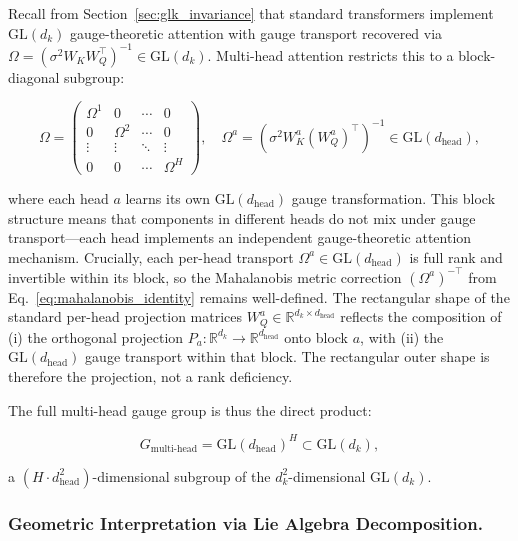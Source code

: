 \documentclass[twoside,11pt]{article}
\begin{document}
Recall from Section~\ref{sec:glk_invariance} that standard transformers implement $\mathrm{GL}(d_k)$ gauge-theoretic attention with gauge transport recovered via $\Omega = (\sigma^2 W_K W_Q^\top)^{-1} \in \mathrm{GL}(d_k)$. Multi-head attention restricts this to a block-diagonal subgroup:

\begin{equation}
\Omega = \begin{pmatrix}
\Omega^1 & 0 & \cdots & 0 \\
0 & \Omega^2 & \cdots & 0 \\
\vdots & \vdots & \ddots & \vdots \\
0 & 0 & \cdots & \Omega^H
\end{pmatrix}, \quad \Omega^a = (\sigma^2 W_K^a (W_Q^a)^\top)^{-1} \in \mathrm{GL}(d_{\text{head}}),
\end{equation}

where each head $a$ learns its own $\mathrm{GL}(d_{\text{head}})$ gauge transformation. This block structure means that components in different heads do not mix under gauge transport---each head implements an independent gauge-theoretic attention mechanism. Crucially, each per-head transport $\Omega^a \in \mathrm{GL}(d_{\text{head}})$ is full rank and invertible within its block, so the Mahalanobis metric correction $(\Omega^a)^{-\top}$ from Eq.~\eqref{eq:mahalanobis_identity} remains well-defined. The rectangular shape of the standard per-head projection matrices $W_Q^a \in \mathbb{R}^{d_k \times d_{\text{head}}}$ reflects the composition of (i) the orthogonal projection $P_a : \mathbb{R}^{d_k} \to \mathbb{R}^{d_{\text{head}}}$ onto block $a$, with (ii) the $\mathrm{GL}(d_{\text{head}})$ gauge transport within that block. The rectangular outer shape is therefore the projection, not a rank deficiency.

The full multi-head gauge group is thus the direct product:

\begin{equation}
G_{\text{multi-head}} = \mathrm{GL}(d_{\text{head}})^H \subset \mathrm{GL}(d_k),
\end{equation}

a $(H \cdot d_{\text{head}}^2)$-dimensional subgroup of the $d_k^2$-dimensional $\mathrm{GL}(d_k)$.

\subsubsection{Geometric Interpretation via Lie Algebra Decomposition.}
\end{document}

